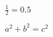 \documentclass[multi={mymath},border=1pt]{standalone}
\newenvironment{mymath}{$\displaystyle}{$}
\begin{document}
\begin{mymath}
  \frac{1}{2}=0.5
\end{mymath}

\begin{mymath}
  a^2 + b^2 = c^2
\end{mymath}
\end{document}
